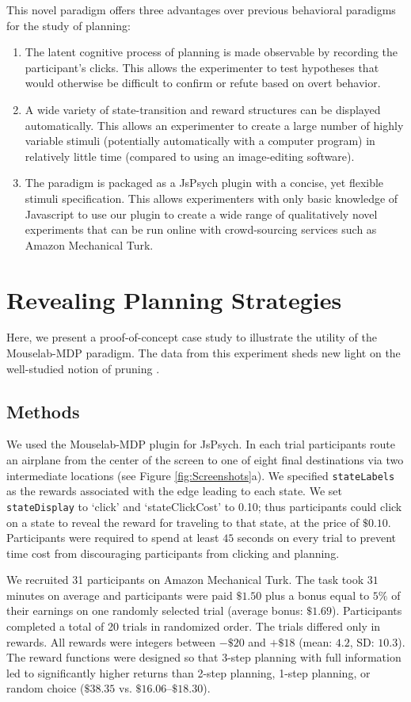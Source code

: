 \documentclass[11pt]{article} %
\begin{document}
This novel paradigm offers three advantages over previous behavioral paradigms for the study of planning:
\begin{enumerate}
\item
  The latent cognitive process of planning is made observable by recording the participant's clicks. This allows the experimenter to test hypotheses that would otherwise be difficult to confirm or refute based on overt behavior.
\item
  A wide variety of state-transition and reward structures can be
  displayed automatically. This allows an experimenter to create a large number of highly variable stimuli (potentially automatically with a computer program) in relatively little time (compared to using an image-editing software).  
\item
  The paradigm is packaged as a JsPsych plugin with a concise, yet
  flexible stimuli specification. This allows experimenters with
  only basic knowledge of Javascript to use our plugin to create
  a wide range of qualitatively novel experiments that can be run
  online with crowd-sourcing services such as Amazon Mechanical Turk.
\end{enumerate}


\section{Revealing Planning Strategies}
Here, we present a proof-of-concept case study to illustrate the utility of the Mouselab-MDP paradigm. The data from this experiment sheds new light on the well-studied notion of pruning \cite{Huys2012}.

\subsection{Methods}
We used the Mouselab-MDP plugin for JsPsych. In each trial participants route an airplane from the center of the screen to one of eight final destinations via two intermediate locations (see Figure \ref{fig:Screenshots}a). We specified \texttt{stateLabels} as the rewards associated with the edge leading to each state. We set \texttt{stateDisplay} to `click' and `stateClickCost' to 0.10; thus participants could click on a state to reveal the reward for traveling to that state, at the price of $\$0.10$. Participants were required to spend at least $45$ seconds on every trial to prevent time cost from discouraging participants from clicking and planning. 

We recruited 31 participants on Amazon Mechanical Turk. The task took $31$ minutes on average and participants were paid $\$1.50$ plus a bonus equal to $5\%$ of their earnings on one randomly selected trial (average bonus: $\$1.69$). Participants completed a total of 20 trials in randomized order. The trials differed only in rewards. All rewards were integers between $-\$20$ and $+\$18$ (mean: $4.2$, SD: $10.3$).  The reward functions were designed so that 3-step planning with full information led to significantly higher returns than 2-step planning, 1-step planning, or random choice ($\$38.35$ vs. $\$16.06$--$\$18.30$).
\end{document}
